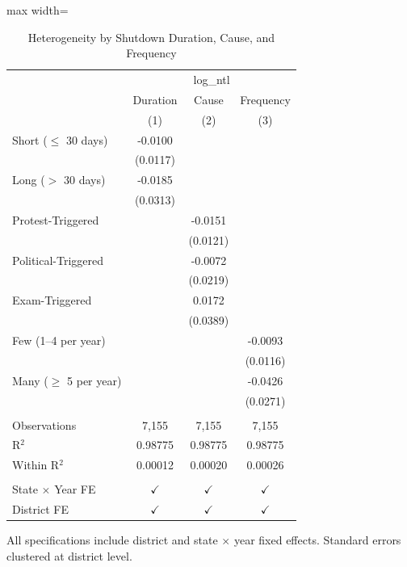 
\begin{table}[htbp]
   \caption{\label{tab:het} Heterogeneity by Shutdown Duration, Cause, and Frequency}
   \bigskip
   \centering
   \begin{adjustbox}{max width=\textwidth}
\begin{tabular}{lccc}
      \toprule
       & \multicolumn{3}{c}{log\_ntl}\\
                                & Duration      & Cause         & Frequency \\   
                                & (1)           & (2)           & (3)\\  
      \midrule 
      Short ($\leq$ 30 days)    & -0.0100       &               &   \\   
                                & (0.0117)      &               &   \\   
      Long ($>$ 30 days)        & -0.0185       &               &   \\   
                                & (0.0313)      &               &   \\   
      Protest-Triggered         &               & -0.0151       &   \\   
                                &               & (0.0121)      &   \\   
      Political-Triggered       &               & -0.0072       &   \\   
                                &               & (0.0219)      &   \\   
      Exam-Triggered            &               & 0.0172        &   \\   
                                &               & (0.0389)      &   \\   
      Few (1--4 per year)       &               &               & -0.0093\\   
                                &               &               & (0.0116)\\   
      Many ($\geq$ 5 per year)  &               &               & -0.0426\\   
                                &               &               & (0.0271)\\   
       \\
      Observations              & 7,155         & 7,155         & 7,155\\  
      R$^2$                     & 0.98775       & 0.98775       & 0.98775\\  
      Within R$^2$              & 0.00012       & 0.00020       & 0.00026\\  
       \\
      State $\times$ Year FE    & $\checkmark$  & $\checkmark$  & $\checkmark$\\   
      District FE               & $\checkmark$  & $\checkmark$  & $\checkmark$\\   
      \bottomrule
   \end{tabular}
\end{adjustbox}
   
   \par \raggedright 
   All specifications include district and state $\times$ year fixed effects. Standard errors clustered at district level.
\end{table}


